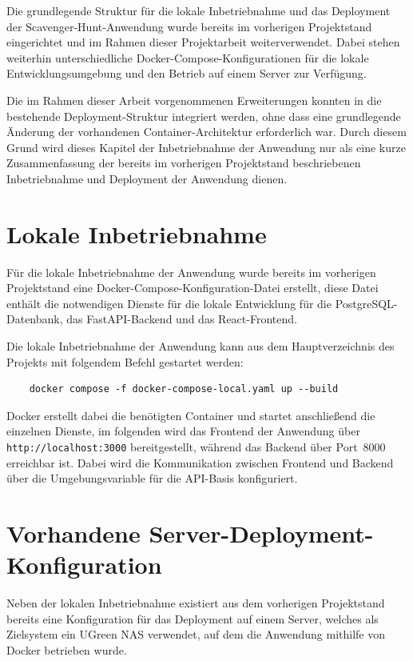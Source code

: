 ﻿\documentclass[oneside]{ausarbeitung}
\begin{document}
Die grundlegende Struktur für die lokale Inbetriebnahme und das Deployment der Scavenger-Hunt-Anwendung wurde bereits im vorherigen Projektstand
eingerichtet und im Rahmen dieser Projektarbeit weiterverwendet. Dabei stehen weiterhin unterschiedliche Docker-Compose-Konfigurationen für die
lokale Entwicklungsumgebung und den Betrieb auf einem Server zur Verfügung. 

Die im Rahmen dieser Arbeit vorgenommenen Erweiterungen konnten in die bestehende Deployment-Struktur integriert werden, ohne dass eine grundlegende
Änderung der vorhandenen Container-Architektur erforderlich war. Durch diesem Grund wird dieses Kapitel der Inbetriebnahme der Anwendung nur 
als eine kurze Zusammenfassung der bereits im vorherigen Projektstand beschriebenen Inbetriebnahme und Deployment der Anwendung dienen.


\section{Lokale Inbetriebnahme}
\label{sec:lokale-inbetriebnahme}

Für die lokale Inbetriebnahme der Anwendung wurde bereits im vorherigen Projektstand eine Docker-Compose-Konfiguration-Datei erstellt, diese
Datei enthält die notwendigen Dienste für die lokale Entwicklung für die PostgreSQL-Datenbank, das FastAPI-Backend und das React-Frontend.

Die lokale Inbetriebnahme der Anwendung kann aus dem Hauptverzeichnis des Projekts mit folgendem Befehl gestartet werden:

\begin{verbatim}
    docker compose -f docker-compose-local.yaml up --build
\end{verbatim}

Docker erstellt dabei die benötigten Container und startet anschließend die einzelnen Dienste, im folgenden wird das Frontend der Anwendung über
\texttt{http://localhost:3000} bereitgestellt, während das Backend über Port~8000 erreichbar ist. Dabei wird die Kommunikation zwischen Frontend
und Backend über die Umgebungsvariable für die API-Basis konfiguriert.


\section{Vorhandene Server-Deployment-Konfiguration}
\label{sec:server-deployment}

Neben der lokalen Inbetriebnahme existiert aus dem vorherigen Projektstand bereits eine Konfiguration für das Deployment auf einem Server, welches 
als Zielsystem ein UGreen NAS verwendet, auf dem die Anwendung mithilfe von Docker betrieben wurde. 
\end{document}
